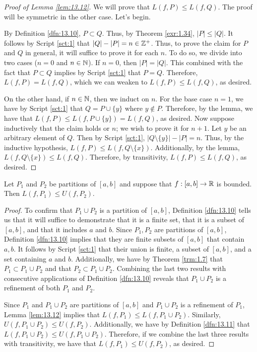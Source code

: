 \documentclass[../main.tex]{subfiles}
\begin{document}
\begin{lemma}
\begin{proof}[Proof of Lemma \ref{lem:13.12}]
        We will prove that $L(f,P)\leq L(f,Q)$. The proof will be symmetric in the other case. Let's begin.\par
        By Definition \ref{dfn:13.10}, $P\subset Q$. Thus, by Theorem \ref{exr:1.34}, $|P|\leq|Q|$. It follows by Script \ref{sct:1} that $|Q|-|P|=n\in\mathbb{Z}^+$. Thus, to prove the claim for $P$ and $Q$ in general, it will suffice to prove it for each $n$. To do so, we divide into two cases ($n=0$ and $n\in\mathbb{N}$). If $n=0$, then $|P|=|Q|$. This combined with the fact that $P\subset Q$ implies by Script \ref{sct:1} that $P=Q$. Therefore, $L(f,P)=L(f,Q)$, which we can weaken to $L(f,P)\leq L(f,Q)$, as desired.\par
        On the other hand, if $n\in\mathbb{N}$, then we induct on $n$. For the base case $n=1$, we have by Script \ref{sct:1} that $Q=P\cup\{y\}$ where $y\notin P$. Therefore, by the lemma, we have that $L(f,P)\leq L(f,P\cup\{y\})=L(f,Q)$, as desired. Now suppose inductively that the claim holds or $n$; we wish to prove it for $n+1$. Let $y$ be an arbitrary element of $Q$. Then by Script \ref{sct:1}, $|Q\setminus\{y\}|-|P|=n$. Thus, by the inductive hypothesis, $L(f,P)\leq L(f,Q\setminus\{x\})$. Additionally, by the lemma, $L(f,Q\setminus\{x\})\leq L(f,Q)$. Therefore, by transitivity, $L(f,P)\leq L(f,Q)$, as desired.
    \end{proof}
\end{lemma}

\begin{theorem}\label{trm:13.13}
    Let $P_1$ and $P_2$ be partitions of $[a,b]$ and suppose that $f:[a,b]\to\mathbb{R}$ is bounded. Then $L(f,P_1)\leq U(f,P_2)$.
    \begin{proof}
        To confirm that $P_1\cup P_2$ is a partition of $[a,b]$, Definition \ref{dfn:13.10} tells us that it will suffice to demonstrate that it is a finite set, that it is a subset of $[a,b]$, and that it includes $a$ and $b$. Since $P_1,P_2$ are partitions of $[a,b]$, Definition \ref{dfn:13.10} implies that they are finite subsets of $[a,b]$ that contain $a,b$. It follows by Script \ref{sct:1} that their union is finite, a subset of $[a,b]$, and a set containing $a$ and $b$. Additionally, we have by Theorem \ref{trm:1.7} that $P_1\subset P_1\cup P_2$ and that $P_2\subset P_1\cup P_2$. Combining the last two results with consecutive applications of Definition \ref{dfn:13.10} reveals that $P_1\cup P_2$ is a refinement of both $P_1$ and $P_2$.\par
        Since $P_1$ and $P_1\cup P_2$ are partitions of $[a,b]$ and $P_1\cup P_2$ is a refinement of $P_1$, Lemma \ref{lem:13.12} implies that $L(f,P_1)\leq L(f,P_1\cup P_2)$. Similarly, $U(f,P_1\cup P_2)\leq U(f,P_2)$. Additionally, we have by Definition \ref{dfn:13.11} that $L(f,P_1\cup P_2)\leq U(f,P_1\cup P_2)$. Therefore, if we combine the last three results with transitivity, we have that $L(f,P_1)\leq U(f,P_2)$, as desired.
    \end{proof}
\end{theorem}
\end{document}
